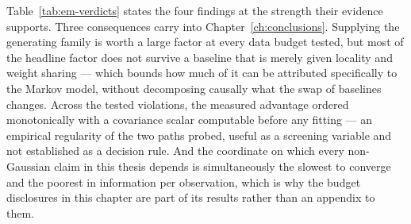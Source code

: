 \noindent Table~\ref{tab:em-verdicts} states the four findings at the strength
their evidence supports. Three consequences carry into
Chapter~\ref{ch:conclusions}. Supplying the
generating family is worth a large factor at every data budget tested, but
most of the headline factor does not survive a baseline that is merely given
locality and weight sharing --- which bounds how much of it can be attributed
specifically to the Markov model, without decomposing causally what the swap
of baselines changes. Across the tested violations, the measured advantage
ordered monotonically with a covariance scalar computable before any fitting
--- an empirical regularity of the two paths probed, useful as a screening
variable and not established as a decision rule. And the coordinate on which
every non-Gaussian claim in this
thesis depends is simultaneously the slowest to converge and the poorest in
information per observation, which is why the budget disclosures in this chapter
are part of its results rather than an appendix to them.
